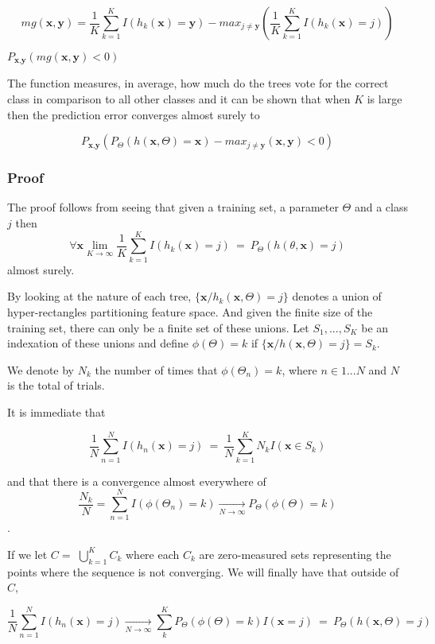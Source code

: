 \documentclass{article}%
\theoremstyle{definition}
\begin{document}
$$mg(\textbf{x},\textbf{y}) =  \frac{1}{K}   \sum_{k=1}^K I(h_k(\textbf{x}) = \textbf{y})  
- max_{j\neq \textbf{y}}\left(\frac{1}{K} \sum_{k=1}^K I(h_k(\textbf{x}) = j) \right) $$ \label{eq:rf-marginFun}

$ P_{\textbf{x}, \textbf{y} }(mg(\textbf{x}, \textbf{y}) < 0) $


The function measures, in average, how much do the trees vote for the correct class in comparison to all other classes and it can be shown that when $K$ is large then the prediction error converges almost surely to 

$$ P_{\textbf{x}, \textbf{y} } ( P_{\Theta} (h(\textbf{x}, \Theta) = \textbf{x}) - max_{j \neq \textbf{y}} (\textbf{x}, \textbf{y}) < 0) $$

\subsubsection{Proof}
The proof follows from seeing that given a training set, a parameter $\Theta$ and a class $j$ then 
$$\forall \textbf{x} \lim_{K\to\infty} \frac{1}{K} \sum_{k=1}^K I(h_k(\textbf{x}) = j) \ =   \ P_\Theta(h(\theta,\textbf{x}) = j) $$
almost surely.

By looking at the nature of each tree, $\{\textbf{x} / h_k(\textbf{x}, \Theta) = j \}$ denotes a union of hyper-rectangles partitioning feature space. And given the finite size of the training set, there can only be a finite set of these unions. Let $S_1, ..., S_K$ be an indexation of these unions and define $\phi(\Theta) = k $ if $\{\textbf{x} / h(\textbf{x}, \Theta) = j \} = S_k$. 

We denote by $N_k$ the number of times that $\phi(\Theta_n) =k $, where $n \in {1...N}$ and $N$ is the total of trials.

It is immediate that 

$$ \frac{1}{N} \sum_{n=1}^N I(h_n(\textbf{x}) = j) \ = \  \frac{1}{N} \sum_{k=1}^K N_k I(\textbf{x} \in S_k)  $$

and that there is a convergence almost everywhere of $$ \frac{N_k}{N} = \sum_{n=1}^N  I(\phi(\Theta_n) = k)  \xrightarrow[N \to \infty]{}   P_{\Theta}(\phi(\Theta)= k)$$. 

If we let $C = $ $\bigcup\limits_{k=1}^{K} C_{k}$ where each $C_k$ are zero-measured sets representing the points where the sequence is not converging. We will finally have that  outside of $C$, 

$$ \frac{1}{N} \sum_{n=1}^N I(h_n(\textbf{x}) = j) \xrightarrow[N \to \infty]{} \sum_k^K    P_{\Theta}(\phi(\Theta)= k) I(\textbf{x} =j ) \ = \ P_{\Theta}(h(\textbf{x}, \Theta) = j)  $$ 
\end{document}
